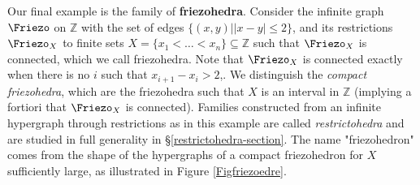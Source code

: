 \begin{example} \label{expleFriezo}
Our final example is  the family of {\bf friezohedra}.  Consider the infinite graph $\Friezo$ on $\mathbb{Z}$ with the set of edges $\{(x,y) ||x-y|\leq 2 \}$, and its restrictions $\Friezo_X$ to finite sets $X=\{x_1<\dots<x_n\} \subseteq \mathbb{Z}$ such that $\Friezo_X$ is connected, which we call friezohedra. Note that $\Friezo_X$  is connected  exactly when there is no $i$ such that $x_{i+1}-x_i>2$,. 
We distinguish the \emph{compact friezohedra}, which are the friezohedra such that  
$X$ is an interval in $\mathbb{Z}$ (implying a fortiori that  $\Friezo_X$  is connected). Families constructed from an infinite hypergraph through restrictions as in this example are called \emph{restrictohedra} and are studied in full generality in \S\ref{restrictohedra-section}.
The name "friezohedron" comes from the shape of the hypergraphs of a compact friezohedron for $X$ sufficiently large, as illustrated in Figure \ref{Figfriezoedre}.
\begin{figure}
\centering
{}


\end{figure}
\end{example}
